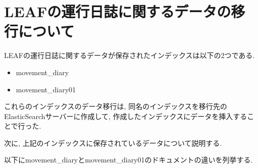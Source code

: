 

\section{LEAFの運行日誌に関するデータの移行について}

LEAFの運行日誌に関するデータが保存されたインデックスは以下の2つである.

\begin{itemize}
    \item movement\_diary
    \item movement\_diary01
\end{itemize}

これらのインデックスのデータ移行は, 同名のインデックスを移行先のElasticSearchサーバーに作成して, 作成したインデックスにデータを挿入することで行った.


次に, 上記のインデックスに保存されているデータについて説明する.


以下にmovement\_diaryとmovement\_diary01のドキュメントの違いを列挙する.

